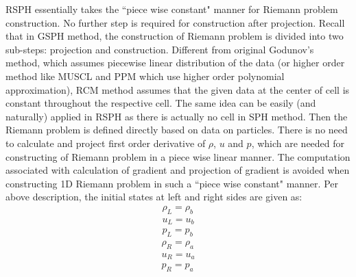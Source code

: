 RSPH essentially takes the ``piece wise constant" manner for Riemann problem construction. No further step is required for construction after projection. Recall that in GSPH method, the construction of Riemann problem is divided into two sub-steps: projection and construction. 
Different from original Godunov's method, which assumes piecewise linear distribution of the data (or higher order method like MUSCL and PPM which use higher order polynomial approximation), RCM method assumes that the given data at the center of cell is constant throughout the respective cell. The same idea can be easily (and naturally) applied in RSPH as there is actually no cell in SPH method. Then the Riemann problem is defined directly based on data on particles. There is no need to calculate and project first order derivative of $\rho$, $u$ and $p$, which are needed for constructing of Riemann problem in a piece wise linear manner. The computation associated with calculation of gradient and projection of gradient is avoided when constructing 1D Riemann problem in such a ``piece wise constant" manner.
Per above description, the initial states at left and right sides are given as: 
\begin{eqnarray}
\rho_L = \rho_b 
\label{eq:Riemann-Prob-define-L-rho} \\
u_L = u_b 
\label{eq:Riemann-Prob-define-L-v} \\
p_L = p_b 
\label{eq:Riemann-Prob-define-L-p}
\end{eqnarray}
\begin{eqnarray}
\rho_R = \rho_a 
\label{eq:Riemann-Prob-define-R-rho} \\
u_R = u_a 
\label{eq:Riemann-Prob-define-R-v} \\
p_R = p_a 
\label{eq:Riemann-Prob-define-R-p}
\end{eqnarray}

